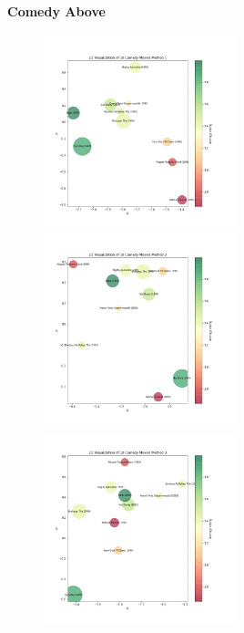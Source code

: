 \documentclass{article}
\begin{document}
\newpage

\paragraph{Comedy Above}

\begin{figure}[H]
\includegraphics[width=0.5\textwidth]{matrixfactorization/2D Visualization of 10 Comedy Movies Method 1.png}
\includegraphics[width=0.5\textwidth]{matrixfactorization/2D Visualization of 10 Comedy Movies Method 2.png}
\includegraphics[width=0.5\textwidth]{matrixfactorization/2D Visualization of 10 Comedy Movies Method 3.png}
\end{figure}
\end{document}
